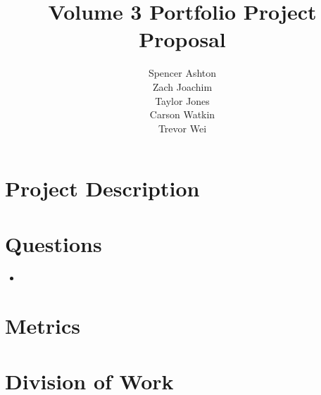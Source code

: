 \documentclass[12pt]{article}
\title{Volume 3 Portfolio Project Proposal}
\author{Spencer Ashton\\Zach Joachim\\Taylor Jones\\Carson Watkin\\Trevor Wei}
\begin{document}
\maketitle

\section{Project Description}

\section{Questions}

\begin{itemize}
    \item 
\end{itemize}

\section{Metrics}

\section{Division of Work}
\end{document}

